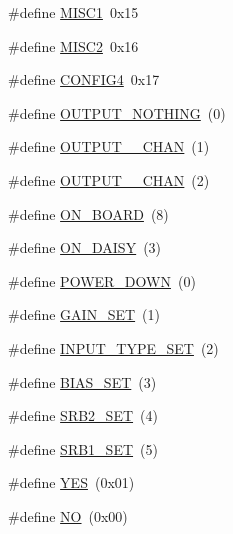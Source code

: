 \begin{DoxyCompactItemize}
\#define \hyperlink{group___definitions___a_d_s1299_gae329ec8008096911d2610e19ddb46c71}{M\+I\+S\+C1}~0x15
\item 
\#define \hyperlink{group___definitions___a_d_s1299_gaae8dcec655baaec75ee902fdb31ef73d}{M\+I\+S\+C2}~0x16
\item 
\#define \hyperlink{group___definitions___a_d_s1299_ga73621b04f3881ce7c5f91812ca82f6b0}{C\+O\+N\+F\+I\+G4}~0x17
\item 
\#define \hyperlink{group___definitions___a_d_s1299_gaff05d0464e9e065f404fe27ba2a43739}{O\+U\+T\+P\+U\+T\+\_\+\+N\+O\+T\+H\+I\+N\+G}~(0)
\item 
\#define \hyperlink{group___definitions___a_d_s1299_gacbec7850612c50434765aec136660982}{O\+U\+T\+P\+U\+T\+\_\+\_\+\+C\+H\+A\+N}~(1)
\item 
\#define \hyperlink{group___definitions___a_d_s1299_ga2bae1a8fca05358e02d35286f226fee4}{O\+U\+T\+P\+U\+T\+\_\+\_\+\+C\+H\+A\+N}~(2)
\item 
\#define \hyperlink{group___definitions___a_d_s1299_ga7a84be7ecbfcd0786f37e45af2682de2}{O\+N\+\_\+\+B\+O\+A\+R\+D}~(8)
\item 
\#define \hyperlink{group___definitions___a_d_s1299_gaa7f391503e74618fa6974101490669ef}{O\+N\+\_\+\+D\+A\+I\+S\+Y}~(3)
\item 
\#define \hyperlink{group___definitions___a_d_s1299_gaad04e0c9afdeec307d5b9cb2062d784d}{P\+O\+W\+E\+R\+\_\+\+D\+O\+W\+N}~(0)
\item 
\#define \hyperlink{group___definitions___a_d_s1299_gae8bcdb2f93ff698e7ff62a41dbc8f3b8}{G\+A\+I\+N\+\_\+\+S\+E\+T}~(1)
\item 
\#define \hyperlink{group___definitions___a_d_s1299_gaa5cb8a0aa13fd1b21b8bba8e5c6ee5f4}{I\+N\+P\+U\+T\+\_\+\+T\+Y\+P\+E\+\_\+\+S\+E\+T}~(2)
\item 
\#define \hyperlink{group___definitions___a_d_s1299_gaa24e8cc3ecb302b3430bdd9def28fef2}{B\+I\+A\+S\+\_\+\+S\+E\+T}~(3)
\item 
\#define \hyperlink{group___definitions___a_d_s1299_ga097bb3289a6ee33d5cf993e8d35cf951}{S\+R\+B2\+\_\+\+S\+E\+T}~(4)
\item 
\#define \hyperlink{group___definitions___a_d_s1299_ga62cf1daadcbe15df7a2ad3613c9808fd}{S\+R\+B1\+\_\+\+S\+E\+T}~(5)
\item 
\#define \hyperlink{group___definitions___a_d_s1299_ga7ebc9a785e5ab85457c98595aac81589}{Y\+E\+S}~(0x01)
\item 
\#define \hyperlink{group___definitions___a_d_s1299_ga996bde01ecac342918f0a2c4e7ce7bd5}{N\+O}~(0x00)

\end{DoxyCompactItemize}
